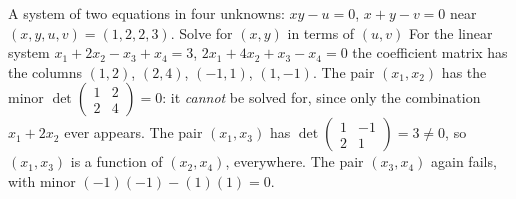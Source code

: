 \begin{worked}{A system of two equations in four unknowns: $xy-u=0$, $x+y-v=0$ near $(x,y,u,v)=(1,2,2,3)$. Solve for $(x,y)$ in terms of $(u,v)$}
For the linear system $x_{1}+2x_{2}-x_{3}+x_{4}=3$,
$2x_{1}+4x_{2}+x_{3}-x_{4}=0$ the coefficient matrix has the columns
$(1,2)$, $(2,4)$, $(-1,1)$, $(1,-1)$. The pair $(x_{1},x_{2})$ has the
minor $\det\begin{pmatrix}1&2\\2&4\end{pmatrix}=0$: it \emph{cannot} be
solved for, since only the combination $x_{1}+2x_{2}$ ever appears. The pair
$(x_{1},x_{3})$ has $\det\begin{pmatrix}1&-1\\2&1\end{pmatrix}=3\neq0$, so
$(x_{1},x_{3})$ is a function of $(x_{2},x_{4})$, everywhere. The pair
$(x_{3},x_{4})$ again fails, with minor $(-1)(-1)-(1)(1)=0$.
\end{worked}

